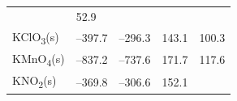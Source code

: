 \documentclass[
  9pt,
]{extbook}
\theoremstyle{definition}
\theoremstyle{definition}
\theoremstyle{definition}
\theoremstyle{remark}
\begin{document}
\begin{longtable}[]{@{}lllll@{}}
\begin{minipage}[t]{0.18\columnwidth}
\end{minipage} & \begin{minipage}[t]{0.18\columnwidth}\raggedright
52.9\strut
\end{minipage}\tabularnewline
\begin{minipage}[t]{0.10\columnwidth}\raggedright
KClO\textsubscript{3}(s)\strut
\end{minipage} & \begin{minipage}[t]{0.19\columnwidth}\raggedright
--397.7\strut
\end{minipage} & \begin{minipage}[t]{0.20\columnwidth}\raggedright
--296.3\strut
\end{minipage} & \begin{minipage}[t]{0.18\columnwidth}\raggedright
143.1\strut
\end{minipage} & \begin{minipage}[t]{0.18\columnwidth}\raggedright
100.3\strut
\end{minipage}\tabularnewline
\begin{minipage}[t]{0.10\columnwidth}\raggedright
KMnO\textsubscript{4}(s)\strut
\end{minipage} & \begin{minipage}[t]{0.19\columnwidth}\raggedright
--837.2\strut
\end{minipage} & \begin{minipage}[t]{0.20\columnwidth}\raggedright
--737.6\strut
\end{minipage} & \begin{minipage}[t]{0.18\columnwidth}\raggedright
171.7\strut
\end{minipage} & \begin{minipage}[t]{0.18\columnwidth}\raggedright
117.6\strut
\end{minipage}\tabularnewline
\begin{minipage}[t]{0.10\columnwidth}\raggedright
KNO\textsubscript{2}(s)\strut
\end{minipage} & \begin{minipage}[t]{0.19\columnwidth}\raggedright
--369.8\strut
\end{minipage} & \begin{minipage}[t]{0.20\columnwidth}\raggedright
--306.6\strut
\end{minipage} & \begin{minipage}[t]{0.18\columnwidth}\raggedright
152.1\strut
\end{minipage} & \begin{minipage}[t]{0.18\columnwidth}\raggedright

\end{minipage}
\end{longtable}
\end{document}
